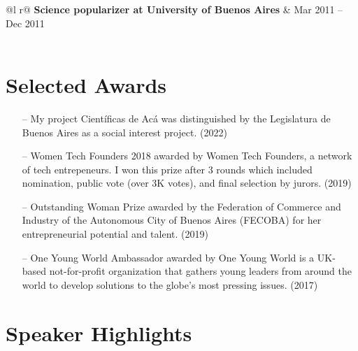 \documentclass[a4paper,12pt]{article}
\begin{document}
\begin{tabularx}{\linewidth}{ @{}l r@{} }
\textbf{Science popularizer at University of Buenos Aires} & \hfill Mar 2011 – Dec 2011 \\[3.75pt]
  \\
\end{tabularx}


\section{Selected Awards}

\begin{itemize}[nosep,after=\strut, leftmargin=1em, itemsep=3pt]
    \item[--] My project Científicas de Acá was distinguished by the Legislatura de Buenos Aires as a social interest project. (2022)
    \item[--] Women Tech Founders 2018 awarded by Women Tech Founders, a network of tech entrepeneurs. I won this prize after 3 rounds which included nomination, public vote (over 3K votes), and final selection by jurors. (2019)
    \item[--] Outstanding Woman Prize awarded by the Federation of Commerce and Industry of the Autonomous City of Buenos Aires (FECOBA) for her entrepreneurial potential and talent. (2019)
    \item[--]  One Young World Ambassador awarded by One Young World is a UK-based not-for-profit organization that gathers young leaders from around the world to develop solutions to the globe's most pressing issues. (2017)
\end{itemize}


\section{Speaker Highlights}
\end{document}
